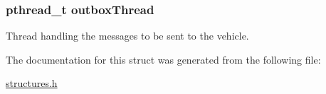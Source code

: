 \subsubsection[{\texorpdfstring{outbox\+Thread}{outboxThread}}]{\setlength{\rightskip}{0pt plus 5cm}pthread\+\_\+t outbox\+Thread}\hypertarget{struct_s_a___v_e_h_i_c_l_e___d_a_t_a_acc00a2bda6d34838311c232bf6aaa6a0}{}\label{struct_s_a___v_e_h_i_c_l_e___d_a_t_a_acc00a2bda6d34838311c232bf6aaa6a0}


Thread handling the messages to be sent to the vehicle. 



The documentation for this struct was generated from the following file\+:\begin{DoxyCompactItemize}
\item 
\hyperlink{structures_8h}{structures.\+h}\end{DoxyCompactItemize}
